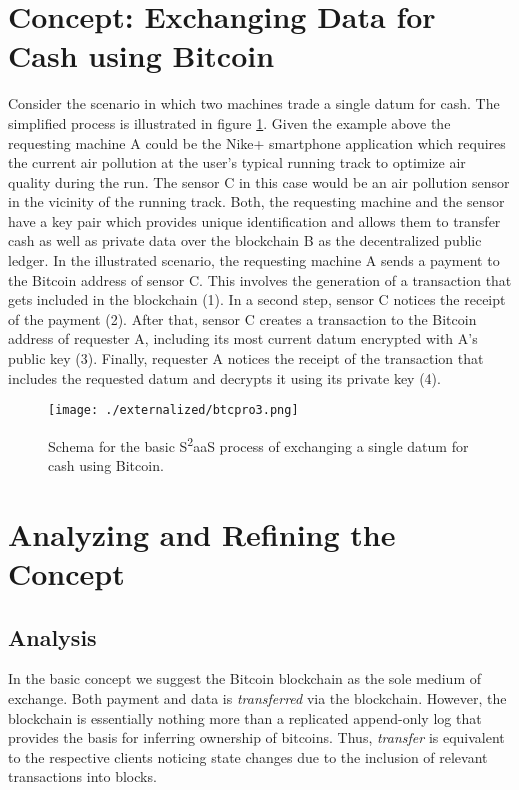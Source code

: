 \section{Concept: Exchanging Data for Cash using Bitcoin}
\label{sec:s2aas_concept}

Consider the scenario in which two machines trade a single datum for cash. The simplified process is illustrated in figure \ref{fig:btcDataExchange}. Given the example above the requesting machine A could be the Nike+ smartphone application which requires the current air pollution at the user's typical running track to optimize air quality during the run. The sensor C in this case would be an air pollution sensor in the vicinity of the running track. Both, the requesting machine and the sensor have a key pair which provides unique identification and allows them to transfer cash as well as private data over the blockchain B as the decentralized public ledger. 
In the illustrated scenario, the requesting machine A sends a payment to the Bitcoin address of sensor C. This involves the generation of a transaction that gets included in the blockchain (1). In a second step, sensor C notices the receipt of the payment (2). After that, sensor C creates a transaction to the Bitcoin address of requester A, including its most current datum encrypted with A's public key (3). Finally, requester A notices the receipt of the transaction that includes the requested datum and decrypts it using its private key (4).

\begin{figure}
\centering
\texttt{[image: ./externalized/btcpro3.png]}
\caption{Schema for the basic S\textsuperscript{2}aaS process of exchanging a single datum for cash using Bitcoin.}
\label{fig:btcDataExchange}
\end{figure}

\section{Analyzing and Refining the Concept}
\label{sec:s2aas_analysis}

\subsection{Analysis}
In the basic concept we suggest the Bitcoin blockchain as the sole medium of exchange. Both payment and data is \emph{transferred} via the blockchain. However, the blockchain is essentially nothing more than a replicated append-only log that provides the basis for inferring ownership of bitcoins. Thus, \emph{transfer} is equivalent to the respective clients noticing state changes due to the inclusion of relevant transactions into blocks.

